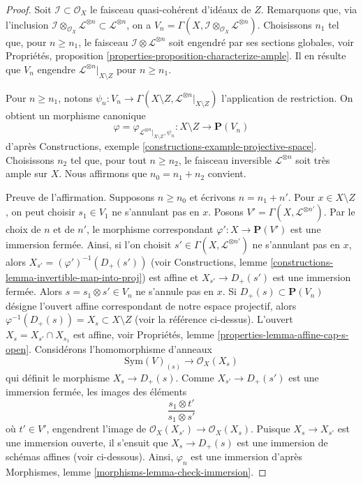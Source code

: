 \begin{proof}
Soit $\mathcal{I} \subset \mathcal{O}_X$ le faisceau quasi-cohérent d'idéaux de
$Z$. Remarquons que, via l'inclusion
$\mathcal{I} \otimes_{\mathcal{O}_X} \mathcal{L}^{\otimes n} \subset
\mathcal{L}^{\otimes n}$, on a
$V_n = \Gamma(X, \mathcal{I} \otimes_{\mathcal{O}_X} \mathcal{L}^{\otimes n})$.
Choisissons $n_1$ tel que, pour $n \geq n_1$, le faisceau
$\mathcal{I} \otimes \mathcal{L}^{\otimes n}$ soit engendré par ses sections globales, voir
Propriétés, proposition \ref{properties-proposition-characterize-ample}.
Il en résulte que $V_n$ engendre $\mathcal{L}^{\otimes n}|_{X \setminus Z}$
pour $n \geq n_1$.

\medskip\noindent
Pour $n \geq n_1$, notons
$\psi_n : V_n \to
\Gamma(X \setminus Z, \mathcal{L}^{\otimes n}|_{X \setminus Z})$
l'application de restriction. On obtient un morphisme canonique
$$
\varphi = \varphi_{\mathcal{L}^{\otimes n}|_{X \setminus Z}, \psi_n} :
X \setminus Z
\longrightarrow
\mathbf{P}(V_n)
$$
d'après Constructions, exemple \ref{constructions-example-projective-space}.
Choisissons $n_2$ tel que, pour tout $n \geq n_2$, le faisceau inversible
$\mathcal{L}^{\otimes n}$ soit très ample sur $X$.
Nous affirmons que $n_0 = n_1 + n_2$ convient.

\medskip\noindent
Preuve de l'affirmation. Supposons $n \geq n_0$ et écrivons $n = n_1 + n'$.
Pour $x \in X \setminus Z$, on peut choisir $s_1 \in V_1$ ne
s'annulant pas en $x$. Posons $V' = \Gamma(X, \mathcal{L}^{\otimes n'})$.
Par le choix de $n$ et de $n'$, le morphisme correspondant
$\varphi' : X \to \mathbf{P}(V')$ est une immersion fermée. Ainsi, si l'on choisit
$s' \in \Gamma(X, \mathcal{L}^{\otimes n'})$ ne s'annulant pas en $x$,
alors $X_{s'} = (\varphi')^{-1}(D_+(s'))$ (voir
Constructions, lemme \ref{constructions-lemma-invertible-map-into-proj})
est affine et $X_{s'} \to D_+(s')$ est une immersion fermée.
Alors $s = s_1 \otimes s' \in V_n$ ne s'annule pas en $x$.
Si $D_+(s) \subset \mathbf{P}(V_n)$ désigne
l'ouvert affine correspondant de notre espace projectif, alors
$\varphi^{-1}(D_+(s)) = X_s \subset X \setminus Z$ (voir la référence ci-dessus).
L'ouvert $X_s = X_{s'} \cap X_{s_1}$ est affine, voir
Propriétés, lemme \ref{properties-lemma-affine-cap-s-open}.
Considérons l'homomorphisme d'anneaux
$$
\text{Sym}(V)_{(s)} \longrightarrow \mathcal{O}_X(X_s)
$$
qui définit le morphisme $X_s \to D_+(s)$. Comme $X_{s'} \to D_+(s')$
est une immersion fermée, les images des éléments
$$
\frac{s_1 \otimes t'}{s_1 \otimes s'}
$$
où $t' \in V'$, engendrent l'image de
$\mathcal{O}_X(X_{s'}) \to \mathcal{O}_X(X_s)$.
Puisque $X_s \to X_{s'}$ est une immersion ouverte,
il s'ensuit que $X_s \to D_+(s)$ est une immersion de schémas affines
(voir ci-dessous). Ainsi, $\varphi_n$ est une immersion d'après
Morphismes, lemme \ref{morphisms-lemma-check-immersion}.


\end{proof}
